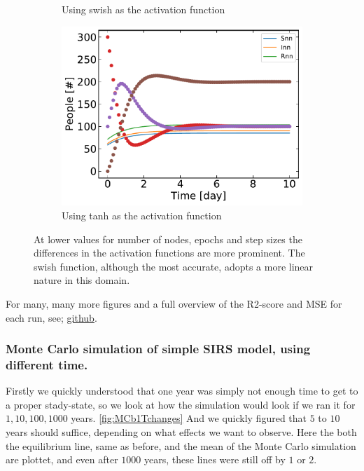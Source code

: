 \begin{figure}[H]
\begin{subfigure}{0.5\textwidth}
		\caption{Using swish as the activation function}
	\end{subfigure}
	\begin{subfigure}{0.5\textwidth}
		\centering
		\includegraphics[width=\linewidth]{result/Resultater_supervised/tanh_100_1000_0001.pdf}
		\caption{Using tanh as the activation function}
	\end{subfigure}
	\caption{At lower values for number of nodes, epochs and step sizes the differences in the activation functions are more prominent. The swish function, although the most accurate, adopts a more linear nature in this domain.}
	\end{figure}
	
	For many, many more figures and a full overview of the R2-score and MSE for each run, see; \href{https://github.com/sondrt/FYS-STK4155/tree/master/Project3/TEX/result}{github}.
 





\subsubsection{Monte Carlo simulation of simple SIRS model, using different time.}
	Firstly we quickly understood that one year was simply not enough time to get to a proper stady-state, so we look at how the simulation would look if we ran it for $1,10,100,1000$ years. \ref{fig:MCb1Tchanges} And we quickly figured that $5$ to $10$ years should suffice, depending on what effects we want to observe. Here the both the equilibrium line, same as before, and the mean of the Monte Carlo simulation are plottet, and even after $1000$ years, these lines were still off by $1$ or $2$. 

